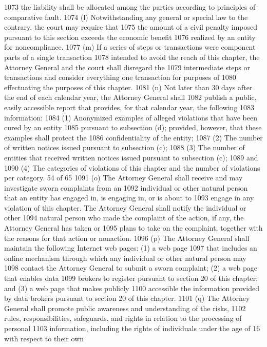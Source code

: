 1073 the liability shall be allocated among the parties according to principles of comparative fault.
1074 (l) Notwithstanding any general or special law to the contrary, the court may require that
1075 the amount of a civil penalty imposed pursuant to this section exceeds the economic benefit
1076 realized by an entity for noncompliance.
1077 (m) If a series of steps or transactions were component parts of a single transaction
1078 intended to avoid the reach of this chapter, the Attorney General and the court shall disregard the
1079 intermediate steps or transactions and consider everything one transaction for purposes of
1080 effectuating the purposes of this chapter.
1081 (n) Not later than 30 days after the end of each calendar year, the Attorney General shall
1082 publish a public, easily accessible report that provides, for that calendar year, the following
1083 information:
1084 (1) Anonymized examples of alleged violations that have been cured by an entity
1085 pursuant to subsection (d); provided, however, that these examples shall protect the
1086 confidentiality of the entity;
1087 (2) The number of written notices issued pursuant to subsection (c);
1088 (3) The number of entities that received written notices issued pursuant to subsection (c);
1089 and
1090 (4) The categories of violations of this chapter and the number of violations per category.
54 of 65
1091 (o) The Attorney General shall receive and may investigate sworn complaints from an
1092 individual or other natural person that an entity has engaged in, is engaging in, or is about to
1093 engage in any violation of this chapter. The Attorney General shall notify the individual or other
1094 natural person who made the complaint of the action, if any, the Attorney General has taken or
1095 plans to take on the complaint, together with the reasons for that action or nonaction.
1096 (p) The Attorney General shall maintain the following Internet web pages: (1) a web page
1097 that includes an online mechanism through which any individual or other natural person may
1098 contact the Attorney General to submit a sworn complaint; (2) a web page that enables data
1099 brokers to register pursuant to section 20 of this chapter; and (3) a web page that makes publicly
1100 accessible the information provided by data brokers pursuant to section 20 of this chapter.
1101 (q) The Attorney General shall promote public awareness and understanding of the risks,
1102 rules, responsibilities, safeguards, and rights in relation to the processing of personal
1103 information, including the rights of individuals under the age of 16 with respect to their own
